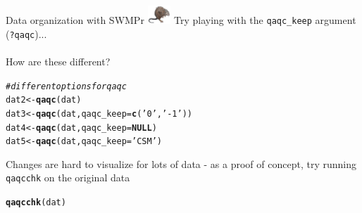 \documentclass[xcolor=dvipsnames,serif]{beamer}\usepackage[]{graphicx}\usepackage[]{color}
\makeatletter
\newcommand{\hlstr}[1]{\textcolor[rgb]{0.192,0.494,0.8}{#1}}%
\newcommand{\hlcom}[1]{\textcolor[rgb]{0.678,0.584,0.686}{\textit{#1}}}%
\newcommand{\hlstd}[1]{\textcolor[rgb]{0.345,0.345,0.345}{#1}}%
\newcommand{\hlkwa}[1]{\textcolor[rgb]{0.161,0.373,0.58}{\textbf{#1}}}%
\newcommand{\hlkwb}[1]{\textcolor[rgb]{0.69,0.353,0.396}{#1}}%
\newcommand{\hlkwc}[1]{\textcolor[rgb]{0.333,0.667,0.333}{#1}}%
\newcommand{\hlkwd}[1]{\textcolor[rgb]{0.737,0.353,0.396}{\textbf{#1}}}%
\newenvironment{kframe}{%
 \def\at@end@of@kframe{}%
 \ifinner\ifhmode%
  \def\at@end@of@kframe{\end{minipage}}%
  \begin{minipage}{\columnwidth}%
 \fi\fi%
 \def\FrameCommand##1{\hskip\@totalleftmargin \hskip-\fboxsep
 \colorbox{shadecolor}{##1}\hskip-\fboxsep
     \hskip-\linewidth \hskip-\@totalleftmargin \hskip\columnwidth}%
 \MakeFramed {\advance\hsize-\width
   \@totalleftmargin\z@ \linewidth\hsize
   \@setminipage}}%
 {\par\unskip\endMakeFramed%
 \at@end@of@kframe}
\newenvironment{knitrout}{}{} %
\makeatother
\begin{document}
\begin{frame}[fragile]{Data organization with SWMPr \includegraphics[width = 0.065\textwidth]{imgs/swmprat.png}}
\onslide<+->
Try playing with the \texttt{qaqc\_keep} argument (\texttt{?qaqc})... \\~\\
How are these different?
\begin{knitrout}\scriptsize
{}\color{fgcolor}\begin{kframe}
\begin{alltt}
\hlcom{# different options for qaqc}
\hlstd{dat2} \hlkwb{<-} \hlkwd{qaqc}\hlstd{(dat)}
\hlstd{dat3} \hlkwb{<-} \hlkwd{qaqc}\hlstd{(dat,} \hlkwc{qaqc_keep} \hlstd{=} \hlkwd{c}\hlstd{(}\hlstr{'0'}\hlstd{,} \hlstr{'-1'}\hlstd{))}
\hlstd{dat4} \hlkwb{<-} \hlkwd{qaqc}\hlstd{(dat,} \hlkwc{qaqc_keep} \hlstd{=} \hlkwa{NULL}\hlstd{)}
\hlstd{dat5} \hlkwb{<-} \hlkwd{qaqc}\hlstd{(dat,} \hlkwc{qaqc_keep} \hlstd{=} \hlstr{'CSM'}\hlstd{)}
\end{alltt}
\end{kframe}
\end{knitrout}
\onslide<+->
Changes are hard to visualize for lots of data - as a proof of concept, try running \texttt{qaqcchk} on the original data
\begin{knitrout}\scriptsize
{}\color{fgcolor}\begin{kframe}
\begin{alltt}
\hlkwd{qaqcchk}\hlstd{(dat)}
\end{alltt}
\end{kframe}
\end{knitrout}
\end{frame}
\end{document}
